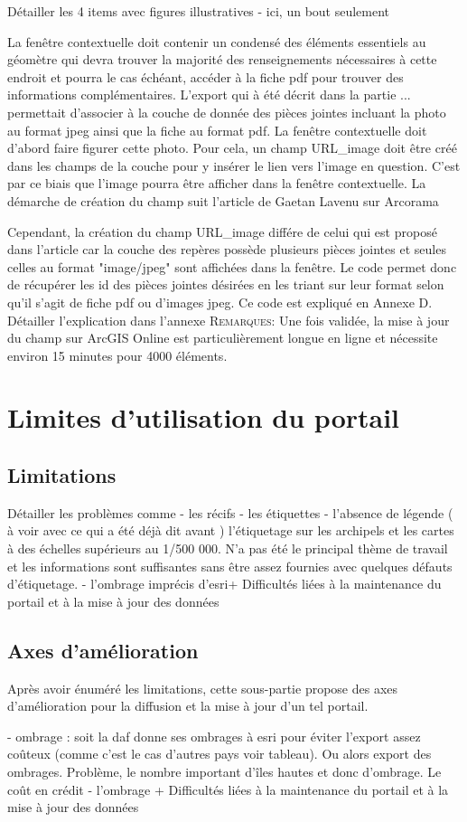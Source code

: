 {\color{magenta} Détailler les 4 items avec figures illustratives - ici, un bout seulement}

La fenêtre contextuelle doit contenir un condensé des éléments essentiels au géomètre qui devra trouver la majorité des renseignements nécessaires à cette endroit et pourra le cas échéant, accéder à la fiche pdf pour trouver des informations complémentaires. L'export qui à été décrit dans la partie ... permettait d'associer à la couche de donnée des pièces jointes incluant la photo au format jpeg ainsi que la fiche au format pdf. La fenêtre contextuelle doit d'abord faire figurer cette photo. Pour cela, un champ URL\_image doit être créé dans les champs de la couche pour y insérer le lien vers l'image en question. C'est par ce biais que l'image pourra être afficher dans la fenêtre contextuelle. La démarche de création du champ suit l'article de Gaetan Lavenu sur Arcorama \cite{lavenu} 

Cependant, la création du champ URL\_image différe de celui qui est proposé dans l'article car la couche des repères possède plusieurs pièces jointes et seules celles au format "image/jpeg" sont affichées dans la fenêtre. Le code permet donc de récupérer les id des pièces jointes désirées en les triant sur leur format selon qu'il s'agit de fiche pdf ou d'images jpeg. Ce code est expliqué en Annexe D. 
{\color{magenta} Détailler l'explication dans l'annexe}
\textsc{Remarques:} Une fois validée, la mise à jour du champ sur ArcGIS Online est particulièrement longue en ligne et nécessite environ 15 minutes pour 4000 éléments.


\section{Limites d'utilisation du portail}

\subsection {Limitations}
{\color{magenta} Détailler les problèmes  comme 
- les récifs
- les étiquettes
- l'absence de légende ( à voir avec ce qui a été déjà dit avant )
l'étiquetage sur les archipels et les cartes à des échelles supérieurs au 1/500 000. N'a pas été le principal thème de travail et les informations sont suffisantes sans être assez fournies avec quelques défauts d'étiquetage.
- l'ombrage imprécis d'esri+ Difficultés liées à la maintenance du portail et à la mise à jour des données}

\subsection {Axes d'amélioration}
Après avoir énuméré les limitations, cette sous-partie propose des axes d'amélioration pour la diffusion et la mise à jour d'un tel portail. 
{\color{magenta} 

- ombrage : soit la daf donne ses ombrages à esri pour éviter l'export assez coûteux (comme c'est le cas d'autres pays voir tableau). Ou alors export des ombrages. Problème, le nombre important d'îles hautes et donc d'ombrage. Le coût en crédit
- l'ombrage + Difficultés liées à la maintenance du portail et à la mise à jour des données}